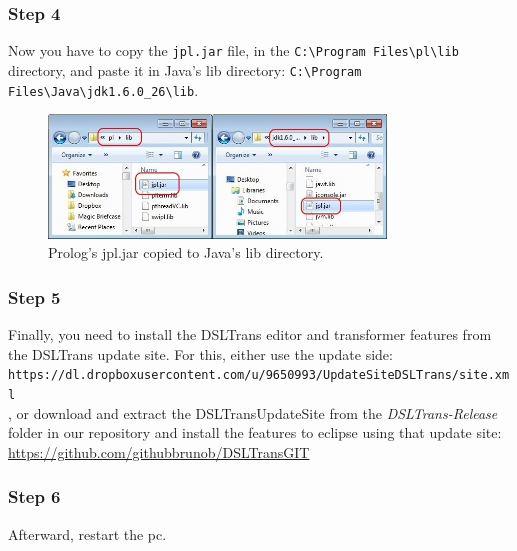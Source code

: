 \subsubsection{Step 4}

Now you have to copy the \verb=jpl.jar= file, in the 
\verb=C:\Program Files\pl\lib= 
directory, and paste it in Java's lib directory: 
\verb=C:\Program Files\Java\jdk1.6.0_26\lib=.

\begin{figure}[h]
\begin{center}
  \includegraphics[width=0.8\textwidth]{imgs/jpl_cpy.jpg}
  \caption{Prolog's jpl.jar copied to Java's lib directory.}
  \label{fig:jpl_cpy}
\end{center}
\end{figure}

\subsubsection{Step 5}

Finally, you need to install the DSLTrans editor and transformer features from the DSLTrans update site.
For this, either use the update side:\\
{\scriptsize
\verb=https://dl.dropboxusercontent.com/u/9650993/UpdateSiteDSLTrans/site.xml=
}\\
, or download and extract the DSLTransUpdateSite from the \emph{DSLTrans-Release} folder in our repository and install the features to eclipse using that update site:\\
\url{https://github.com/githubbrunob/DSLTransGIT}


\subsubsection{Step 6}

Afterward, restart the pc.

\clearpage

